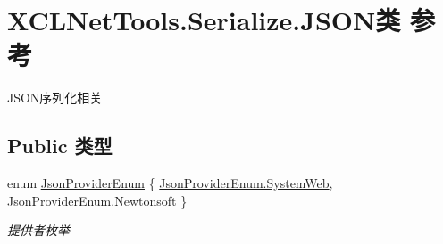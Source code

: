 \hypertarget{class_x_c_l_net_tools_1_1_serialize_1_1_j_s_o_n}{}\section{X\+C\+L\+Net\+Tools.\+Serialize.\+J\+S\+O\+N类 参考}
\label{class_x_c_l_net_tools_1_1_serialize_1_1_j_s_o_n}


J\+S\+O\+N序列化相关  


\subsection*{Public 类型}
\begin{DoxyCompactItemize}
\item 
enum \hyperlink{class_x_c_l_net_tools_1_1_serialize_1_1_j_s_o_n_acb00f7258e4dedfaa0cec15ce9335a31}{Json\+Provider\+Enum} \{ \hyperlink{class_x_c_l_net_tools_1_1_serialize_1_1_j_s_o_n_acb00f7258e4dedfaa0cec15ce9335a31a67a1b1b70420ea0e3be332a9dedcb83e}{Json\+Provider\+Enum.\+System\+Web}, 
\hyperlink{class_x_c_l_net_tools_1_1_serialize_1_1_j_s_o_n_acb00f7258e4dedfaa0cec15ce9335a31a3dae1400047ce0f8033b4d8f2815fc92}{Json\+Provider\+Enum.\+Newtonsoft}
 \}\begin{DoxyCompactList}\small\item\em 提供者枚举 \end{DoxyCompactList}
\end{DoxyCompactItemize}
